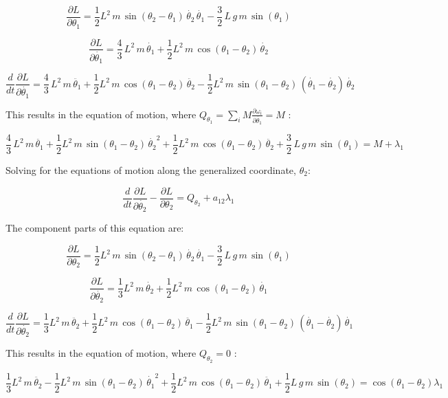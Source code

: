 \documentclass[12pt, letterpaper]{../assignment}
\begin{document}
$$ \frac{\partial L}{\partial \theta_1} = 
\frac{1}{2}L^2 \,m\,\sin \left(\theta_2 -\theta_1 \right)\,\dot{\theta_2} \,\dot{\theta_1}-
\frac{3}{2}\,L\,g\,m\,\sin \left(\theta_1 \right) $$

$$ \frac{\partial L}{\partial \dot{\theta_1}}  =
\frac{4}{3}\,L^2 \,m\,\dot{\theta_1} +
\frac{1}{2}L^2 \,m\,\cos \left(\theta_1 -\theta_2 \right)\,\dot{\theta_2}  $$

$$ \frac{d}{d t} \frac{\partial L}{\partial \dot{\theta_1}} =
\frac{4}{3}\,L^2 \,m\,\ddot{\theta_1}+
\frac{1}{2}L^2 \,m\,\cos \left(\theta_1 -\theta_2 \right)\,\ddot{\theta_2} -
\frac{1}{2}L^2 \,m\,\sin \left(\theta_1 -\theta_2 \right)\,{\left(\dot{\theta_1} -\dot{\theta_2} \right)}\,\dot{\theta_2} $$


This results in the equation of motion,
where $Q_{\theta_1} = \sum_{i} M \frac{\partial \omega_i}{\partial \dot{\theta_1}} = M $ :

$$ \frac{4}{3}\,L^2 \,m\,\ddot{\theta_1} +
\frac{1}{2}L^2 \,m\,\sin \left(\theta_1 -\theta_2 \right)\,{\dot{\theta_2}}^2+
\frac{1}{2}L^2 \,m\,\cos \left(\theta_1 -\theta_2 \right)\,\ddot{\theta_2}+
\frac{3}{2}\,L\,g\,m\,\sin \left(\theta_1 \right) =
M + \lambda_1 $$

Solving for the equations of motion along the generalized coordinate, $\theta_2$:

$$ \frac{d}{d t} \frac{\partial L}{\partial \dot{\theta_2}} - \frac{\partial L}{\partial \theta_2} = 
Q_{\theta_2} + a_{12} \lambda_1 $$

The component parts of this equation are:

$$ \frac{\partial L}{\partial \theta_2} = 
\frac{1}{2}L^2 \,m\,\sin \left(\theta_2 -\theta_1 \right)\,\dot{\theta_2} \,\dot{\theta_1} -
\frac{3}{2}\,L\,g\,m\,\sin \left(\theta_1 \right) $$

$$ \frac{\partial L}{\partial \dot{\theta_2}}  =
\frac{1}{3}L^2 \,m\,\dot{\theta_2} +
\frac{1}{2}L^2 \,m\,\cos \left(\theta_1 -\theta_2 \right)\,\dot{\theta_1} $$

$$ \frac{d}{d t} \frac{\partial L}{\partial \dot{\theta_2}} =
\frac{1}{3}L^2 \,m\,\ddot{\theta_2} +
\frac{1}{2}L^2 \,m\,\cos \left(\theta_1 -\theta_2 \right)\,\ddot{\theta_1} -
\frac{1}{2}L^2 \,m\,\sin \left(\theta_1 -\theta_2 \right)\,{\left(\dot{\theta_1} -\dot{\theta_2} \right)}\,\dot{\theta_1}  $$

This results in the equation of motion,
where $Q_{\theta_2} = 0 $ :


$$ \frac{1}{3}L^2 \,m\,\ddot{\theta_2}-
\frac{1}{2}L^2 \,m\,\sin \left(\theta_1 -\theta_2 \right)\,{\dot{\theta_1}}^2 +
\frac{1}{2}L^2 \,m\,\cos \left(\theta_1 -\theta_2 \right)\,\ddot{\theta_1}+
\frac{1}{2}L\,g\,m\,\sin \left(\theta_2 \right) =
\cos \left(\theta_1 -\theta_2 \right) \lambda_1$$
\end{document}
